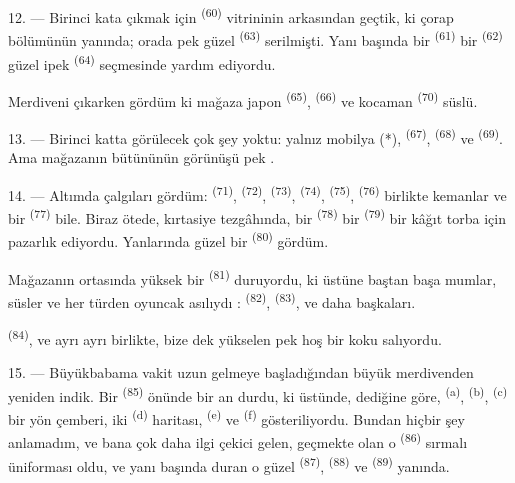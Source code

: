 12. --- Birinci kata çıkmak için  \textsuperscript{(60)}
vitrininin arkasından geçtik, ki çorap bölümünün yanında; orada pek güzel
 \textsuperscript{(63)} serilmişti. Yanı başında bir
 \textsuperscript{(61)} bir 
\textsuperscript{(62)} güzel ipek  \textsuperscript{(64)}
seçmesinde yardım ediyordu.

Merdiveni çıkarken gördüm ki mağaza japon 
\textsuperscript{(65)},  \textsuperscript{(66)} ve
kocaman  \textsuperscript{(70)} süslü.

13. --- Birinci katta görülecek çok şey yoktu: yalnız mobilya (*),
 \textsuperscript{(67)}, 
\textsuperscript{(68)} ve  \textsuperscript{(69)}. Ama
mağazanın bütününün görünüşü pek .

14. --- Altımda çalgıları gördüm:  \textsuperscript{(71)},
 \textsuperscript{(72)}, 
\textsuperscript{(73)},  \textsuperscript{(74)},
 \textsuperscript{(75)}, 
\textsuperscript{(76)} birlikte kemanlar ve bir 
\textsuperscript{(77)} bile. Biraz ötede, kırtasiye tezgâhında, bir
 \textsuperscript{(78)} bir 
\textsuperscript{(79)} bir kâğıt torba için pazarlık ediyordu. Yanlarında
güzel bir  \textsuperscript{(80)} gördüm.

Mağazanın ortasında yüksek bir  \textsuperscript{(81)}
duruyordu, ki üstüne baştan başa mumlar, süsler ve her türden oyuncak asılıydı
:  \textsuperscript{(82)}, 
\textsuperscript{(83)}, ve daha başkaları.

 \textsuperscript{(84)},  ve
ayrı ayrı  birlikte, bize dek yükselen pek hoş bir koku
salıyordu.

\VUsaut{3.4mm}
\VUsaut{2.8mm}

15. --- Büyükbabama vakit uzun gelmeye başladığından büyük merdivenden yeniden
indik. Bir  \textsuperscript{(85)} önünde bir an
durdu, ki üstünde, dediğine göre, 
\textsuperscript{(a)},  \textsuperscript{(b)},
 \textsuperscript{(c)}  bir yön çemberi, iki  \textsuperscript{(d)}
haritası,  \textsuperscript{(e)} ve 
\textsuperscript{(f)} gösteriliyordu. Bundan hiçbir şey anlamadım, ve bana çok
daha ilgi çekici gelen, geçmekte olan o 
\textsuperscript{(86)} sırmalı üniforması oldu, ve yanı başında duran o güzel
 \textsuperscript{(87)}, 
\textsuperscript{(88)} ve  \textsuperscript{(89)} yanında.

